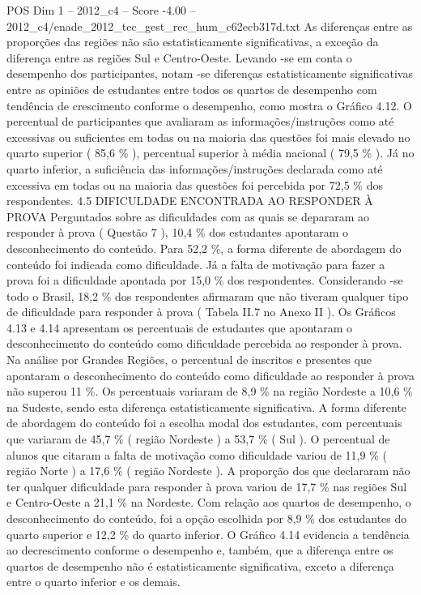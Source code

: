 \begin{textsample}{POS Dim 1 – 2012\_c4 – Score -4.00 – 2012\_c4/enade\_2012\_tec\_gest\_rec\_hum\_c62ecb317d.txt}
As diferenças entre as proporções das regiões não são estatisticamente significativas, a exceção da diferença entre as regiões Sul e Centro-Oeste.
Levando -se em conta o desempenho dos participantes, notam -se diferenças estatisticamente significativas entre as opiniões de estudantes entre todos os quartos de desempenho com tendência de crescimento conforme o desempenho, como mostra o Gráfico 4.12.
O percentual de participantes que avaliaram as informações/instruções como até excessivas ou suficientes em todas ou na maioria das questões foi mais elevado no quarto superior ( 85,6 \% ), percentual superior à média nacional ( 79,5 \% ).
Já no quarto inferior, a suficiência das informações/instruções declarada como até excessiva em todas ou na maioria das questões foi percebida por 72,5 \% dos respondentes. 4.5 DIFICULDADE ENCONTRADA AO RESPONDER À PROVA Perguntados sobre as dificuldades com as quais se depararam ao responder à prova ( Questão 7 ), 10,4 \% dos estudantes apontaram o desconhecimento do conteúdo.
Para 52,2 \%, a forma diferente de abordagem do conteúdo foi indicada como dificuldade.
Já a falta de motivação para fazer a prova foi a dificuldade apontada por 15,0 \% dos respondentes.
Considerando -se todo o Brasil, 18,2 \% dos respondentes afirmaram que não tiveram qualquer tipo de dificuldade para responder à prova ( Tabela II.7 no Anexo II ).
Os Gráficos 4.13 e 4.14 apresentam os percentuais de estudantes que apontaram o desconhecimento do conteúdo como dificuldade percebida ao responder à prova.
Na análise por Grandes Regiões, o percentual de inscritos e presentes que apontaram o desconhecimento do conteúdo como dificuldade ao responder à prova não superou 11 \%.
Os percentuais variaram de 8,9 \% na região Nordeste a 10,6 \% na Sudeste, sendo esta diferença estatisticamente significativa.
A forma diferente de abordagem do conteúdo foi a escolha modal dos estudantes, com percentuais que variaram de 45,7 \% ( região Nordeste ) a 53,7 \% ( Sul ).
O percentual de alunos que citaram a falta de motivação como dificuldade variou de 11,9 \% ( região Norte ) a 17,6 \% ( região Nordeste ).
A proporção dos que declararam não ter qualquer dificuldade para responder à prova variou de 17,7 \% nas regiões Sul e Centro-Oeste a 21,1 \% na Nordeste.
Com relação aos quartos de desempenho, o desconhecimento do conteúdo, foi a opção escolhida por 8,9 \% dos estudantes do quarto superior e 12,2 \% do quarto inferior.
O Gráfico 4.14 evidencia a tendência ao decrescimento conforme o desempenho e, também, que a diferença entre os quartos de desempenho não é estatisticamente significativa, exceto a diferença entre o quarto inferior e os demais.

\end{textsample}
